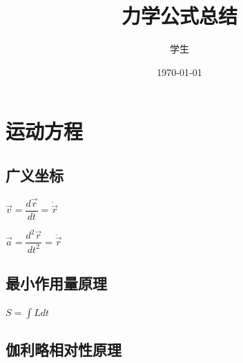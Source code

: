 \documentclass{ctexbook}   %
\title{力学公式总结}
\author{学生}
\date{\today}
\begin{document}
	\chapter{运动方程}
	\section{广义坐标}
	$\vec{v}=\dfrac{d\vec{r}}{dt}=\dot{\vec{r}}$
	
	$\vec{a}=\dfrac{d^2\vec{r}}{dt^2}=\ddot{\vec{r}}$
	\section{最小作用量原理}
		$S=\int Ldt $
		\section{伽利略相对性原理}
\end{document}
